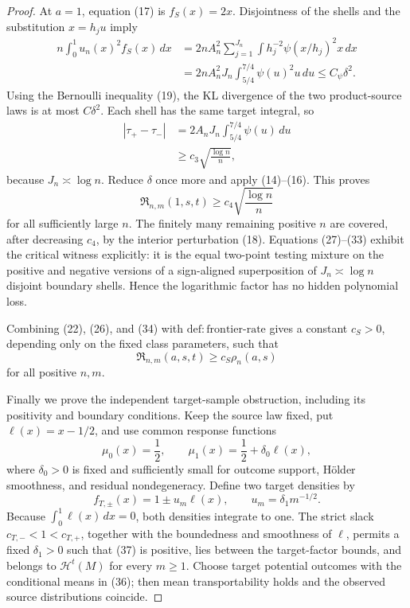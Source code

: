 \documentclass{article}
\begin{document}
\begin{proof}
At \(a=1\), equation (17) is \(f_S(x)=2x\).  Disjointness of the shells and the substitution \(x=h_ju\) imply
\[
 \begin{aligned}
 n\int_0^1u_n(x)^2f_S(x)\,dx
 &=2nA_n^2\sum_{j=1}^{J_n}
   \int h_j^{-2}\psi(x/h_j)^2x\,dx\\
 &=2nA_n^2J_n\int_{5/4}^{7/4}\psi(u)^2u\,du
 \leq C_\psi\delta^2.
 \end{aligned}
 \tag{32}
\]
Using the Bernoulli inequality (19), the KL divergence of the two product-source laws is at most \(C\delta^2\).  Each shell has the same target integral, so
\[
 \begin{aligned}
 |\tau_+-\tau_-|
 &=2A_nJ_n\int_{5/4}^{7/4}\psi(u)\,du\\
 &\geq c_3\sqrt{\frac{\log n}{n}},
 \end{aligned}
 \tag{33}
\]
because \(J_n\asymp\log n\).  Reduce \(\delta\) once more and apply (14)--(16).  This proves
\[
 \mathfrak R_{n,m}(1,s,t)\geq c_4\sqrt{\frac{\log n}{n}}
 \tag{34}
\]
for all sufficiently large \(n\).  The finitely many remaining positive \(n\) are covered, after decreasing \(c_4\), by the interior perturbation (18).  Equations (27)--(33) exhibit the critical witness explicitly: it is the equal two-point testing mixture on the positive and negative versions of a sign-aligned superposition of \(J_n\asymp\log n\) disjoint boundary shells.  Hence the logarithmic factor has no hidden polynomial loss.

Combining (22), (26), and (34) with \(\mathrm{def:frontier\text{-}rate}\) gives a constant \(c_S>0\), depending only on the fixed class parameters, such that
\[
 \mathfrak R_{n,m}(a,s,t)\geq c_S\rho_n(a,s)
 \tag{35}
\]
for all positive \(n,m\).

Finally we prove the independent target-sample obstruction, including its positivity and boundary conditions.  Keep the source law fixed, put \(\ell(x)=x-1/2\), and use common response functions
\[
 \mu_0(x)=\frac12,
 \qquad
 \mu_1(x)=\frac12+\delta_0\ell(x),
 \tag{36}
\]
where \(\delta_0>0\) is fixed and sufficiently small for outcome support, H\"older smoothness, and residual nondegeneracy.  Define two target densities by
\[
 f_{T,\pm}(x)=1\pm u_m\ell(x),
 \qquad
 u_m=\delta_1m^{-1/2}.
 \tag{37}
\]
Because \(\int_0^1\ell(x)\,dx=0\), both densities integrate to one.  The strict slack \(c_{T,-}<1<c_{T,+}\), together with the boundedness and smoothness of \(\ell\), permits a fixed \(\delta_1>0\) such that (37) is positive, lies between the target-factor bounds, and belongs to \(\mathcal H^t(M)\) for every \(m\geq1\).  Choose target potential outcomes with the conditional means in (36); then mean transportability holds and the observed source distributions coincide.


\end{proof}
\end{document}
